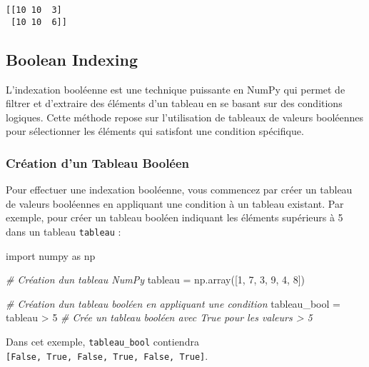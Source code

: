 \documentclass[11pt]{article}
\newenvironment{Shaded}{}{}
\newcommand{\DecValTok}[1]{\textcolor[rgb]{0.25,0.63,0.44}{{#1}}}
\newcommand{\CommentTok}[1]{\textcolor[rgb]{0.38,0.63,0.69}{\textit{{#1}}}}
\newcommand{\NormalTok}[1]{{#1}}
\newcommand{\ImportTok}[1]{{#1}}
\newcommand{\OperatorTok}[1]{\textcolor[rgb]{0.40,0.40,0.40}{{#1}}}
\begin{document}
    \begin{Verbatim}[commandchars=\\\{\}]
[[10 10  3]
 [10 10  6]]
    \end{Verbatim}

    \hypertarget{boolean-indexing}{%
\subsection{Boolean Indexing}\label{boolean-indexing}}

L'indexation booléenne est une technique puissante en NumPy qui permet
de filtrer et d'extraire des éléments d'un tableau en se basant sur des
conditions logiques. Cette méthode repose sur l'utilisation de tableaux
de valeurs booléennes pour sélectionner les éléments qui satisfont une
condition spécifique.

\hypertarget{cruxe9ation-dun-tableau-booluxe9en}{%
\subsubsection{Création d'un Tableau
Booléen}\label{cruxe9ation-dun-tableau-booluxe9en}}

Pour effectuer une indexation booléenne, vous commencez par créer un
tableau de valeurs booléennes en appliquant une condition à un tableau
existant. Par exemple, pour créer un tableau booléen indiquant les
éléments supérieurs à 5 dans un tableau \texttt{tableau} :

\begin{Shaded}
\begin{Highlighting}[]
\ImportTok{import}\NormalTok{ numpy }\ImportTok{as}\NormalTok{ np}

\CommentTok{\# Création d\textquotesingle{}un tableau NumPy}
\NormalTok{tableau }\OperatorTok{=}\NormalTok{ np.array([}\DecValTok{1}\NormalTok{, }\DecValTok{7}\NormalTok{, }\DecValTok{3}\NormalTok{, }\DecValTok{9}\NormalTok{, }\DecValTok{4}\NormalTok{, }\DecValTok{8}\NormalTok{])}

\CommentTok{\# Création d\textquotesingle{}un tableau booléen en appliquant une condition}
\NormalTok{tableau\_bool }\OperatorTok{=}\NormalTok{ tableau }\OperatorTok{\textgreater{}} \DecValTok{5}  \CommentTok{\# Crée un tableau booléen avec True pour les valeurs \textgreater{} 5}
\end{Highlighting}
\end{Shaded}

Dans cet exemple, \texttt{tableau\_bool} contiendra
\texttt{{[}False,\ True,\ False,\ True,\ False,\ True{]}}.
\end{document}
